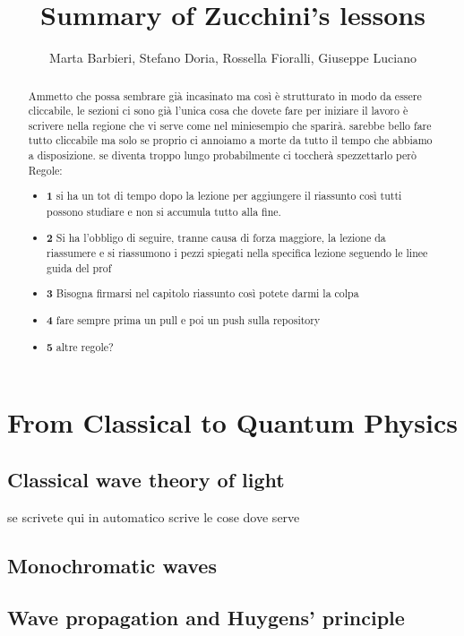 \documentclass{article}
\title{Summary of Zucchini’s lessons}
\author{Marta Barbieri, Stefano Doria, Rossella Fioralli, Giuseppe Luciano}
\begin{document}
\maketitle
\begin{abstract}
    Ammetto che possa sembrare già incasinato ma così è strutturato in modo da essere cliccabile, le sezioni ci sono già l'unica cosa che dovete fare per iniziare il lavoro è scrivere nella regione che vi serve come nel miniesempio che sparirà. sarebbe bello fare tutto cliccabile ma solo se proprio ci annoiamo a morte da tutto il tempo che abbiamo a disposizione. se diventa troppo lungo probabilmente ci toccherà spezzettarlo però
    Regole:
    \begin{itemize}
\item \textbf{1} 
 si ha un tot di tempo dopo la lezione per aggiungere il riassunto così tutti possono studiare e non si accumula tutto alla fine. 
 
\item \textbf{2} 
Si ha l'obbligo di seguire, tranne causa di forza maggiore, la lezione da riassumere e si riassumono i pezzi spiegati nella specifica lezione seguendo le linee guida del prof 
\item \textbf{3}
Bisogna firmarsi nel capitolo riassunto così potete darmi la colpa
\item \textbf{4}
fare sempre prima un pull e poi un push sulla repository
\item \textbf{5}
altre regole?
\end{itemize}
   
\end{abstract}

\tableofcontents
\linenumbers %

\section{From Classical to Quantum Physics}
\subsection{Classical wave theory of light}
se scrivete qui in automatico scrive le cose dove serve
\subsection{Monochromatic waves}
\subsection{Wave propagation and Huygens' principle}
\end{document}

